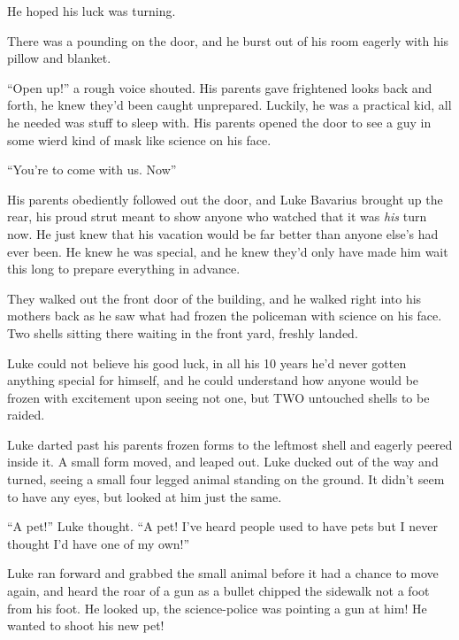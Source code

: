 He hoped his luck was turning.



There was a pounding on the door, and he burst out of his room
eagerly with his pillow and blanket.



``Open up!'' a rough voice shouted. His parents gave frightened looks
back and forth, he knew they'd been caught unprepared. Luckily, he
was a practical kid, all he needed was stuff to sleep with. His
parents opened the door to see a guy in some wierd kind of mask
like science on his face.



``You're to come with us. Now''



His parents obediently followed out the door, and Luke Bavarius
brought up the rear, his proud strut meant to show anyone who
watched that it was {\em his} turn now. He just knew that his
vacation would be far better than anyone else's had ever been. He
knew he was special, and he knew they'd only have made him wait
this long to prepare everything in advance.



They walked out the front door of the building, and he walked right
into his mothers back as he saw what had frozen the policeman with
science on his face. Two shells sitting there waiting in the front
yard, freshly landed.



Luke could not believe his good luck, in all his 10 years he'd
never gotten anything special for himself, and he could understand
how anyone would be frozen with excitement upon seeing not one, but
TWO untouched shells to be raided.



Luke darted past his parents frozen forms to the leftmost shell and
eagerly peered inside it. A small form moved, and leaped out. Luke
ducked out of the way and turned, seeing a small four legged animal
standing on the ground. It didn't seem to have any eyes, but looked
at him just the same.



``A pet!'' Luke thought. ``A pet! I've heard people used to have pets
but I never thought I'd have one of my own!''



Luke ran forward and grabbed the small animal before it had a
chance to move again, and heard the roar of a gun as a bullet
chipped the sidewalk not a foot from his foot. He looked up, the
science-police was pointing a gun at him! He wanted to shoot his
new pet!



